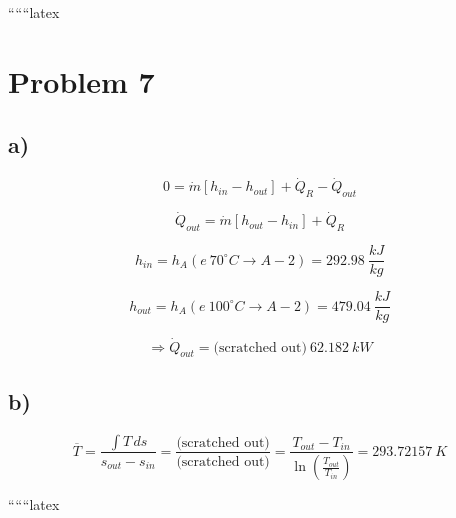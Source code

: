 
``````latex

\section*{Problem 7}

\subsection*{a)}

\begin{equation*}
0 = \dot{m} \left[ h_{in} - h_{out} \right] + \dot{Q}_R - \dot{Q}_{out}
\end{equation*}

\begin{equation*}
\dot{Q}_{out} = \dot{m} \left[ h_{out} - h_{in} \right] + \dot{Q}_R
\end{equation*}

\begin{equation*}
h_{in} = h_{A} (e \ 70^\circ C \rightarrow A-2) = 292.98 \ \frac{kJ}{kg}
\end{equation*}

\begin{equation*}
h_{out} = h_{A} (e \ 100^\circ C \rightarrow A-2) = 479.04 \ \frac{kJ}{kg}
\end{equation*}

\begin{equation*}
\Rightarrow \dot{Q}_{out} = \text{(scratched out)} \ 62.182 \ kW
\end{equation*}

\subsection*{b)}

\begin{equation*}
\overline{T} = \frac{\int T \, ds}{s_{out} - s_{in}} = \frac{\text{(scratched out)}}{\text{(scratched out)}} = \frac{T_{out} - T_{in}}{\ln \left( \frac{T_{out}}{T_{in}} \right)} = 293.72157 \ K
\end{equation*}

``````latex


